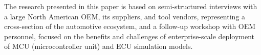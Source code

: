 

The research presented in this paper is based on semi-structured interviews
with a large North American OEM, its suppliers, and tool vendors,
representing a cross-section of the automotive ecosystem,
and a follow-up workshop with OEM personnel,
focused on the benefits and challenges of 
enterprise-scale deployment of MCU (microcontroller unit) and ECU
simulation models.

